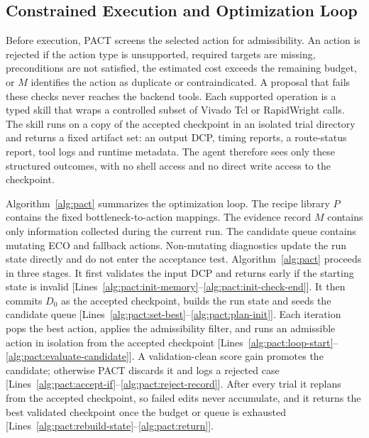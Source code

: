 \documentclass[conference]{IEEEtran}
\newcommand{\rev}[1]{#1}
\begin{document}
\subsection{Constrained Execution and Optimization Loop}
\label{sec:optimization-loop}

Before execution, PACT screens the selected action for
admissibility. 
An action is rejected if the action type is unsupported, required targets are missing, preconditions are not satisfied, the estimated cost exceeds the remaining budget, or $M$ identifies the action as duplicate or contraindicated.
A proposal that fails these checks never reaches the backend
tools. Each supported operation is a typed skill that wraps a controlled
subset of Vivado Tcl or RapidWright calls. The skill runs on a copy of
the accepted checkpoint in an isolated trial directory and returns a
fixed artifact set: an output DCP, timing reports, a route-status
report, tool logs and runtime metadata. The agent therefore sees only
these structured outcomes, with no shell access and no direct write
access to the checkpoint.

Algorithm~\ref{alg:pact} summarizes the optimization loop. The
recipe library $P$ contains the fixed bottleneck-to-action mappings. The
evidence record $M$ contains only information collected during the
current run. The candidate queue contains mutating ECO and fallback
actions. Non-mutating diagnostics update the run state directly and do
not enter the acceptance test. \rev{Algorithm~\ref{alg:pact} proceeds in
three stages. It first validates the input DCP and returns early if the
starting state is invalid
[Lines~\ref{alg:pact:init-memory}--\ref{alg:pact:init-check-end}]. It
then commits $D_0$ as the accepted checkpoint, builds the run state and
seeds the candidate queue
[Lines~\ref{alg:pact:set-best}--\ref{alg:pact:plan-init}]. Each iteration
pops the best action, applies the admissibility filter, and runs an
admissible action in isolation from the accepted checkpoint
[Lines~\ref{alg:pact:loop-start}--\ref{alg:pact:evaluate-candidate}]. A
validation-clean score gain promotes the candidate; otherwise PACT
discards it and logs a rejected case
[Lines~\ref{alg:pact:accept-if}--\ref{alg:pact:reject-record}]. After
every trial it replans from the accepted checkpoint, so failed edits
never accumulate, and it returns the best validated checkpoint once the
budget or queue is exhausted
[Lines~\ref{alg:pact:rebuild-state}--\ref{alg:pact:return}].}
\end{document}
